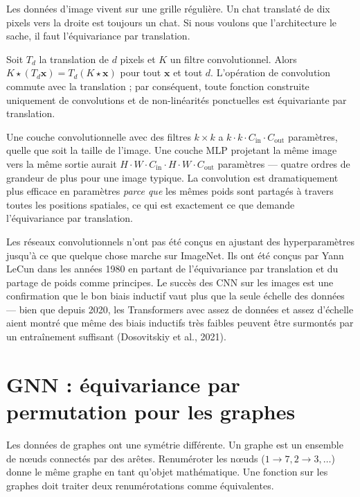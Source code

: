 Les données d'image vivent sur une grille régulière. Un chat translaté de dix pixels vers la droite est toujours un chat. Si nous voulons que l'architecture le sache, il faut l'équivariance par translation.

\begin{proposition}
Soit $T_d$ la translation de $d$ pixels et $K$ un filtre convolutionnel. Alors $K \star (T_d \bm{x}) = T_d (K \star \bm{x})$ pour tout $\bm{x}$ et tout $d$. L'opération de convolution commute avec la translation ; par conséquent, toute fonction construite uniquement de convolutions et de non-linéarités ponctuelles est équivariante par translation.
\end{proposition}

Une couche convolutionnelle avec des filtres $k \times k$ a $k \cdot k \cdot C_{\text{in}} \cdot C_{\text{out}}$ paramètres, quelle que soit la taille de l'image. Une couche MLP projetant la même image vers la même sortie aurait $H \cdot W \cdot C_{\text{in}} \cdot H \cdot W \cdot C_{\text{out}}$ paramètres --- quatre ordres de grandeur de plus pour une image typique. La convolution est dramatiquement plus efficace en paramètres \emph{parce que} les mêmes poids sont partagés à travers toutes les positions spatiales, ce qui est exactement ce que demande l'équivariance par translation.

\begin{aitip}
Les réseaux convolutionnels n'ont pas été conçus en ajustant des hyperparamètres jusqu'à ce que quelque chose marche sur ImageNet. Ils ont été conçus par Yann LeCun dans les années 1980 en partant de l'équivariance par translation et du partage de poids comme principes. Le succès des CNN sur les images est une confirmation que le bon biais inductif vaut plus que la seule échelle des données --- bien que depuis 2020, les Transformers avec assez de données et assez d'échelle aient montré que même des biais inductifs très faibles peuvent être surmontés par un entraînement suffisant (Dosovitskiy et al., 2021).
\end{aitip}

\section{GNN : équivariance par permutation pour les graphes}

Les données de graphes ont une symétrie différente. Un graphe est un ensemble de nœuds connectés par des arêtes. Renuméroter les nœuds ($1 \to 7, 2 \to 3, \ldots$) donne le même graphe en tant qu'objet mathématique. Une fonction sur les graphes doit traiter deux renumérotations comme équivalentes.

